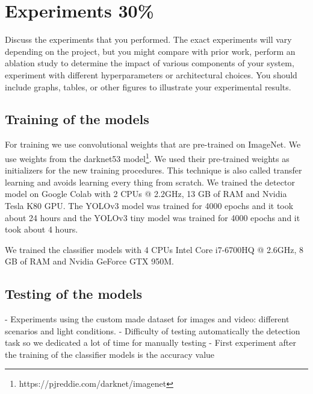 \section{Experiments 30\%}
Discuss the experiments that you performed. The exact experiments will vary depending on the project, but you might compare with prior work, perform an ablation study to determine the impact of various components of your system, experiment with different hyperparameters or architectural choices. You should include graphs, tables, or other figures to illustrate your experimental results.
\subsection{Training of the models}
For training we use convolutional weights that are pre-trained on ImageNet. We use weights from the darknet53 model\footnote{https://pjreddie.com/darknet/imagenet}. We used their pre-trained weights as initializers for the new training procedures. This technique is also called transfer learning and avoids learning every thing from scratch. We trained the detector model on Google Colab with 2 CPUs @ 2.2GHz, 
13 GB of RAM and Nvidia Tesla K80 GPU. The YOLOv3 model was trained for 4000 epochs and it took about 24 hours and the YOLOv3 tiny model was trained for 4000 epochs and it took about 4 hours.


We trained the classifier models with 4 CPUs Intel Core i7-6700HQ @ 2.6GHz, 8 GB of RAM and Nvidia GeForce GTX 950M.
 
\subsection{Testing of the models}

- Experiments using the custom made dataset for images and video: different scenarios and light conditions.
- Difficulty of testing automatically the detection task so we dedicated a lot of time for manually testing 
- First experiment after the training of the classifier models is the accuracy value
